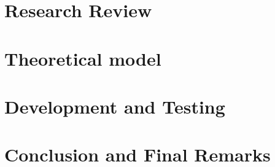 \documentclass[a4paper,11pt]{article}
\begin{document}
\begin{multicols}{2}
\section{Research Review}
\section{Theoretical model}
\section{Development and Testing}
\section{Conclusion and Final Remarks}

\newpage


\end{multicols}
\end{document}
